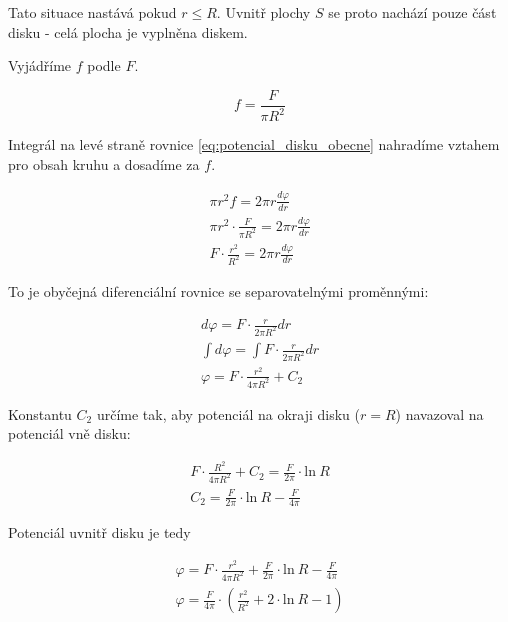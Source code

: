 \documentclass{book}
\begin{document}
Tato situace nastává pokud \(r \leq R\). Uvnitř plochy \(S\) se proto nachází pouze část disku - celá plocha je vyplněna diskem.

Vyjádříme \(f\) podle \(F\).

\begin{equation}
f = \frac{F}{\pi R^2}
\end{equation}

Integrál na levé straně rovnice \eqref{eq:potencial_disku_obecne} nahradíme vztahem pro obsah kruhu a dosadíme za \(f\).

\begin{equation}
\begin{split}
\pi r^2 f = 2 \pi r \frac{d \varphi}{dr} \\
\pi r^2 \cdot \frac{F}{\pi R^2} = 2 \pi r \frac{d \varphi}{dr} \\
F \cdot \frac{r^2}{R^2} = 2 \pi r \frac{d \varphi}{dr}
\end{split}
\end{equation}

To je obyčejná diferenciální rovnice se separovatelnými proměnnými:

\begin{equation}
\label{eq:potencial_disku_uvnitr}
\begin{split}
d \varphi = F \cdot \frac{r}{2 \pi R^2} dr \\
\int d \varphi = \int F \cdot \frac{r}{2 \pi R^2} dr \\
\varphi = F \cdot \frac{r^2}{4 \pi R^2} + C_2
\end{split}
\end{equation}

Konstantu \(C_2\) určíme tak, aby potenciál na okraji disku (\(r = R\)) navazoval na potenciál vně disku:

\begin{equation}
\begin{split}
F \cdot \frac{R^2}{4 \pi R^2} + C_2 = \frac{F}{2 \pi} \cdot \mathrm{ln} \ R \\
C_2 = \frac{F}{2 \pi} \cdot \mathrm{ln} \ R - \frac{F}{4 \pi}
\end{split}
\end{equation}

Potenciál uvnitř disku je tedy

\begin{equation}
\begin{split}
\varphi = F \cdot \frac{r^2}{4 \pi R^2} + \frac{F}{2 \pi} \cdot \mathrm{ln} \ R - \frac{F}{4 \pi} \\
\varphi = \frac{F}{4 \pi} \cdot \left (\frac{r^2}{R^2} + 2 \cdot \mathrm{ln} \ R - 1 \right)
\end{split}
\end{equation}
\end{document}
